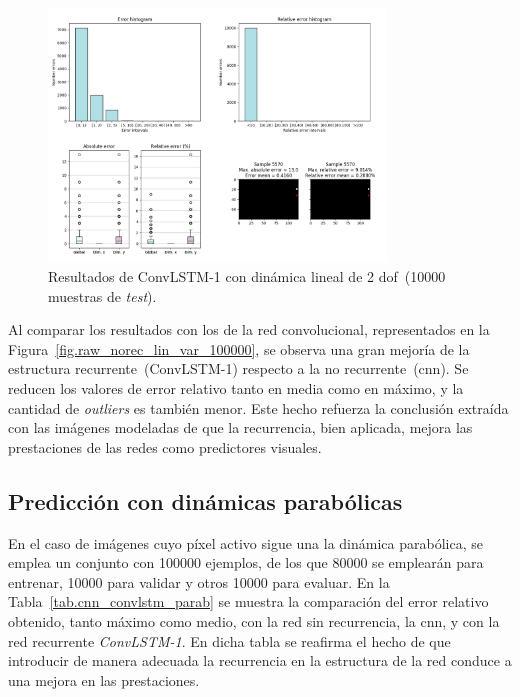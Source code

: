 \begin{figure}[H]
		\begin{center}
			\includegraphics[width=0.8\textwidth]{ figures/test_raw/REC/ConvLSTM_simple/linear_var_100000.png}
			\caption{Resultados de ConvLSTM-1 con dinámica lineal de 2 \acrshort{dof}~(10000 muestras de \textit{test}).}
			\label{fig.raw_convlstm1_lin_var_100000}
		\end{center}
\end{figure}
\vspace{-10pt}

Al comparar los resultados con los de la red convolucional, representados en la Figura~\ref{fig.raw_norec_lin_var_100000}, se observa una gran mejoría de la estructura recurrente~(ConvLSTM-1) respecto a la no recurrente~(\acrshort{cnn}). Se reducen los valores de error relativo tanto en media como en máximo, y la cantidad de \textit{outliers} es también menor. Este hecho refuerza la conclusión extraída con las imágenes modeladas de que la recurrencia, bien aplicada, mejora las prestaciones de las redes como predictores visuales.

\subsection{Predicción con dinámicas parabólicas}
En el caso de imágenes cuyo píxel activo sigue una la dinámica parabólica, se emplea un conjunto con 100000 ejemplos, de los que 80000 se emplearán para entrenar, 10000 para validar y otros 10000 para evaluar. En la Tabla~\ref{tab.cnn_convlstm_parab} se muestra la comparación del error relativo obtenido, tanto máximo como medio, con la red sin recurrencia, la \acrshort{cnn}, y con la red recurrente \textit{ConvLSTM-1}. En dicha tabla se reafirma el hecho de que introducir de manera adecuada la recurrencia en la estructura de la red conduce a una mejora en las prestaciones.

